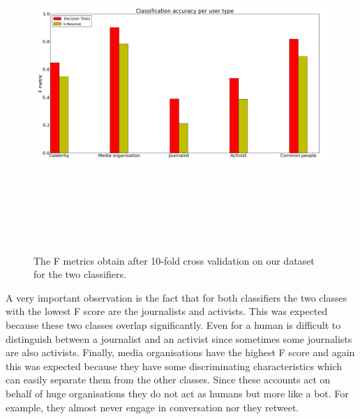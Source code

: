 \begin{figure}[htbp]
  \begin{center}
    \includegraphics[height=5in, width=6in]{classifiers}
    \caption{The F metrics obtain after 10-fold cross validation on our dataset for the two classifiers.}
    \label{DifferentClassifiersResultsImproved}
  \end{center}
\end{figure}
A very important observation is the fact that for both classifiers the two classes with the lowest F score are the journalists and activists. This was expected because these two classes overlap significantly. Even for a human is difficult to distinguish between a journalist and an activist since sometimes some journalists are also activists. Finally, media organisations have the highest F score and again this was expected because they have some discriminating characteristics which can easily separate them from the other classes. Since these accounts act on behalf of huge organisations they do not act as humans but more like a bot. For example, they almost never engage in conversation nor they retweet.  


